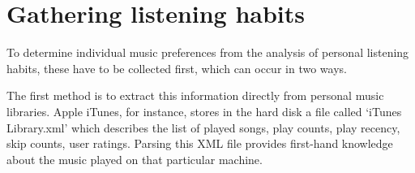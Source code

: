 % 
% 
% 
% 
\section{Gathering listening habits} %
\label{sec:implicit_approach}

To determine individual music preferences from the analysis of personal listening habits, these have to be collected first, which can occur in two ways.

The first method is to extract this information directly from personal music libraries. 
Apple iTunes, for instance, stores in the hard disk a file called `iTunes Library.xml' which describes the list of played songs, play counts, play recency, skip counts, user ratings.
Parsing this XML file provides first-hand knowledge about the music played on that particular machine.

